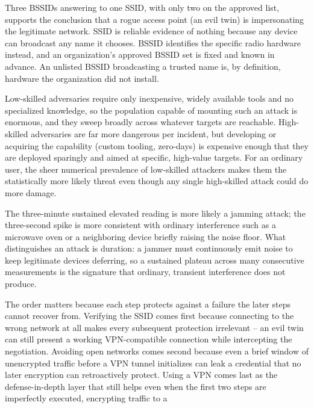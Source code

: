 \begin{answerkey}
\item Three BSSIDs answering to one SSID, with only two on the approved list, supports the
conclusion that a rogue access point (an evil twin) is impersonating the legitimate network. SSID
is reliable evidence of nothing because any device can broadcast any name it chooses. BSSID
identifies the specific radio hardware instead, and an organization's approved BSSID set is fixed
and known in advance. An unlisted BSSID broadcasting a trusted name is, by definition, hardware
the organization did not install.
\item Low-skilled adversaries require only inexpensive, widely available tools and no specialized
knowledge, so the population capable of mounting such an attack is enormous, and they sweep broadly
across whatever targets are reachable. High-skilled adversaries are far more dangerous per
incident, but developing or acquiring the capability (custom tooling, zero-days) is expensive
enough that they are deployed sparingly and aimed at specific, high-value targets. For an ordinary
user, the sheer numerical prevalence of low-skilled attackers makes them the statistically more
likely threat even though any single high-skilled attack could do more damage.
\item The three-minute sustained elevated reading is more likely a jamming attack; the three-second
spike is more consistent with ordinary interference such as a microwave oven or a neighboring
device briefly raising the noise floor. What distinguishes an attack is duration: a jammer must
continuously emit noise to keep legitimate devices deferring, so a sustained plateau across many
consecutive measurements is the signature that ordinary, transient interference does not produce.
\item The order matters because each step protects against a failure the later steps cannot
recover from. Verifying the SSID comes first because connecting to the wrong network at all makes
every subsequent protection irrelevant -- an evil twin can still present a working VPN-compatible
connection while intercepting the negotiation. Avoiding open networks comes second because even a
brief window of unencrypted traffic before a VPN tunnel initializes can leak a credential that no
later encryption can retroactively protect. Using a VPN comes last as the defense-in-depth layer
that still helps even when the first two steps are imperfectly executed, encrypting traffic to a

\end{answerkey}
